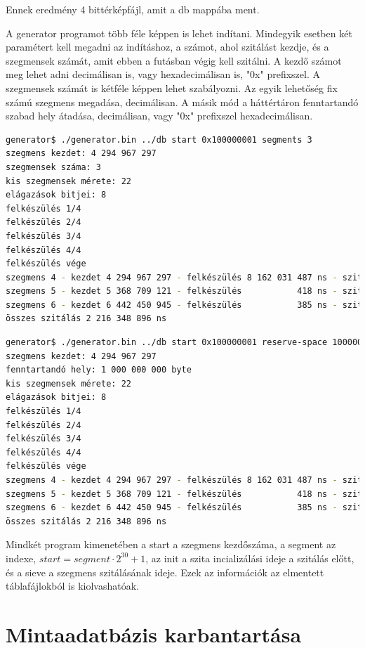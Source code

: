 \documentclass[12pt]{report}
\begin{document}
Ennek eredmény 4 bittérképfájl, amit a db mappába ment.

A generator programot több féle képpen is lehet indítani.
Mindegyik esetben két paramétert kell megadni az indításhoz,
a számot, ahol szitálást kezdje, és a szegmensek számát, amit
ebben a futásban végig kell szitálni.
A kezdő számot meg lehet adni decimálisan is, vagy hexadecimálisan is,
"0x" prefixszel. A szegmensek számát is kétféle képpen lehet szabályozni.
Az egyik lehetőség fix számú szegmens megadása, decimálisan.
A másik mód a háttértáron fenntartandó szabad hely átadása, decimálisan,
vagy "0x" prefixszel hexadecimálisan.

\tiny
\begin{lstlisting}[language=bash]
generator$ ./generator.bin ../db start 0x100000001 segments 3
szegmens kezdet: 4 294 967 297
szegmensek száma: 3
kis szegmensek mérete: 22
elágazások bitjei: 8
felkészülés 1/4
felkészülés 2/4
felkészülés 3/4
felkészülés 4/4
felkészülés vége
szegmens 4 - kezdet 4 294 967 297 - felkészülés 8 162 031 487 ns - szitálás 729 914 370 ns
szegmens 5 - kezdet 5 368 709 121 - felkészülés           418 ns - szitálás 736 412 117 ns
szegmens 6 - kezdet 6 442 450 945 - felkészülés           385 ns - szitálás 750 022 409 ns
összes szitálás 2 216 348 896 ns
\end{lstlisting}
\small

\tiny
\begin{lstlisting}[language=bash]
generator$ ./generator.bin ../db start 0x100000001 reserve-space 1000000000
szegmens kezdet: 4 294 967 297
fenntartandó hely: 1 000 000 000 byte 
kis szegmensek mérete: 22
elágazások bitjei: 8
felkészülés 1/4
felkészülés 2/4
felkészülés 3/4
felkészülés 4/4
felkészülés vége
szegmens 4 - kezdet 4 294 967 297 - felkészülés 8 162 031 487 ns - szitálás 729 914 370 ns
szegmens 5 - kezdet 5 368 709 121 - felkészülés           418 ns - szitálás 736 412 117 ns
szegmens 6 - kezdet 6 442 450 945 - felkészülés           385 ns - szitálás 750 022 409 ns
összes szitálás 2 216 348 896 ns
\end{lstlisting}
\small

Mindkét program kimenetében a start a szegmens kezdőszáma, a segment az indexe,
$start=segment \cdot 2^{30}+1$, az init a szita incializálási ideje a szitálás előtt,
és a sieve a szegmens szitálásának ideje. Ezek az információk az elmentett
táblafájlokból is kiolvashatóak.

\section{Mintaadatbázis karbantartása}
\end{document}
